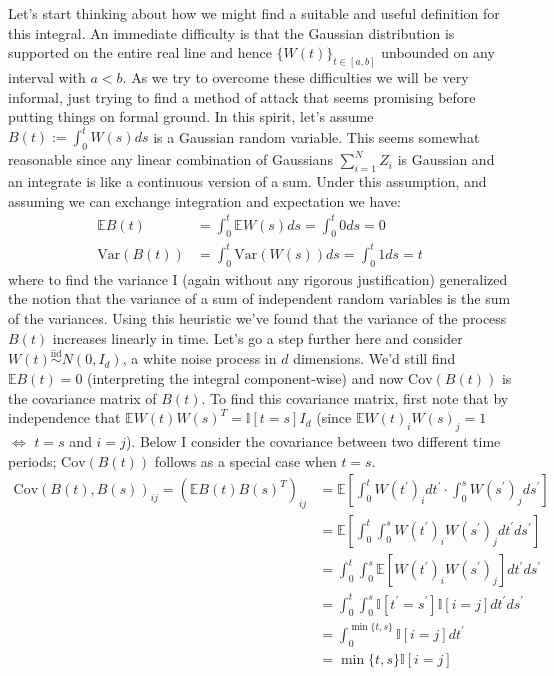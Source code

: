 \documentclass[12pt]{article}
\newcommand{\E}{\mathbb{E}}
\newcommand{\Var}{\mathrm{Var}}
\newcommand{\Cov}{\mathrm{Cov}}
\begin{document}
 Let's start thinking about how we might find a suitable and useful definition for this integral. An immediate difficulty is that the Gaussian distribution is supported on the entire 
 real line and hence $\{W(t)\}_{t \in [a, b]}$ unbounded on any interval with $a < b$. As we try to overcome these difficulties we will be very informal, just trying to find a method 
 of attack that seems promising before putting things on formal ground. In this spirit, let's assume $B(t) := \int_{0}^{t} W(s) ds$ is a Gaussian random variable. This seems somewhat
 reasonable since any linear combination of Gaussians $\sum_{i = 1}^{N} Z_i$ is Gaussian and an integrate is like a continuous version of a sum. Under this assumption, and assuming
 we can exchange integration and expectation we have: 
 \begin{align*}
 \E B(t) &= \int_{0}^{t} \E W(s) ds = \int_{0}^{t} 0 ds = 0 \\
 \Var(B(t)) &= \int_{0}^{t} \Var(W(s)) ds = \int_{0}^{t} 1 ds = t
 \end{align*}
where to find the variance I (again without any rigorous justification) generalized the notion that the variance of a sum of independent random variables is the sum of the variances. 
Using this heuristic we've found that the variance of the process $B(t)$ increases linearly in time. Let's go a step further here and consider $W(t) \overset{\text{iid}}{\sim} N(0, I_d)$, 
a white noise process in $d$ dimensions. We'd still find $\E B(t) = 0$ (interpreting the integral component-wise) and now $\Cov(B(t))$ is the covariance matrix of $B(t)$. 
To find this covariance matrix, first note that by independence that $\E W(t)W(s)^T = \mathbb{I}[t = s]I_d$ (since $\E W(t)_i W(s)_j = 1$ $\iff$ $t = s$ and $i = j$). 
Below I consider the covariance between two different time periods; $\Cov(B(t))$ follows as a special case when $t = s$.  
\begin{align*}
\Cov(B(t), B(s))_{ij} = \left(\E B(t)B(s)^T\right)_{ij} &= \E\left[\int_{0}^{t} W(t^\prime)_i dt^\prime \cdot \int_{0}^{s} W(s^\prime)_j ds^\prime \right] \\
		    			  &= \E\left[\int_{0}^{t} \int_{0}^{s} W(t^\prime)_i W(s^\prime)_j dt^\prime ds^\prime \right] \\
					  &= \int_{0}^{t}\int_{0}^{s}  \E \left[W(t^\prime)_i W(s^\prime)_j\right] dt^\prime ds^\prime \\
					  &= \int_{0}^{t}\int_{0}^{s} \mathbb{I}[t^\prime = s^\prime] \mathbb{I}[i = j] dt^\prime ds^\prime \\
					  &= \int_{0}^{\min\{t, s\}} \mathbb{I}[i = j] dt^\prime \\
					  &= \min\{t, s\} \mathbb{I}[i = j]\\
\end{align*}
\end{document}
